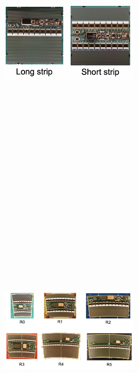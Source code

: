 \begin{figure}[h]
    \begin{subfigure}[b]{0.45\textwidth}
        \centering
        \includegraphics[width=7cm,height=15cm,keepaspectratio]{Figures/modules/Barrel_Modules.png}
        \caption{}\label{fig:barrel}
    \end{subfigure}
    \begin{subfigure}[b]{0.45\textwidth}
        \centering
        \includegraphics[width=7cm,height=15cm,keepaspectratio]{Figures/modules/EC_Modules.png}

\end{subfigure}
\end{figure}
